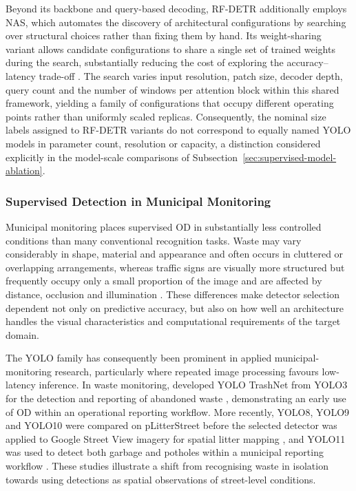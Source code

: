 Beyond its backbone and query-based decoding, \gls{RF-DETR} additionally employs \gls{NAS}, which automates the discovery of architectural configurations by searching over structural choices rather than fixing them by hand. Its weight-sharing variant allows candidate configurations to share a single set of trained weights during the search, substantially reducing the cost of exploring the accuracy--latency trade-off \cite{robinson2026rfdetrneuralarchitecturesearch}. The search varies input resolution, patch size, decoder depth, query count and the number of windows per attention block within this shared framework, yielding a family of configurations that occupy different operating points rather than uniformly scaled replicas. Consequently, the nominal size labels assigned to \gls{RF-DETR} variants do not correspond to equally named \gls{YOLO} models in parameter count, resolution or capacity, a distinction considered explicitly in the model-scale comparisons of Subsection~\ref{sec:supervised-model-ablation}.

\subsubsection{Supervised Detection in Municipal Monitoring}
\label{sec:bg-od-municipal}
Municipal monitoring places supervised \gls{OD} in substantially less controlled conditions than many conventional recognition tasks. Waste may vary considerably in shape, material and appearance and often occurs in cluttered or overlapping arrangements, whereas traffic signs are visually more structured but frequently occupy only a small proportion of the image and are affected by distance, occlusion and illumination \cite{BG17-small-signs,BG20-sign-glare}. These differences make detector selection dependent not only on predictive accuracy, but also on how well an architecture handles the visual characteristics and computational requirements of the target domain.

The \gls{YOLO} family has consequently been prominent in applied municipal-monitoring research, particularly where repeated image processing favours low-latency inference. In waste monitoring, \citeauthor{decarolis2020yolotrashnet} developed YOLO TrashNet from \gls{YOLO}3 for the detection and reporting of abandoned waste \cite{decarolis2020yolotrashnet}, demonstrating an early use of \gls{OD} within an operational reporting workflow. More recently, \gls{YOLO}8, \gls{YOLO}9 and \gls{YOLO}10 were compared on pLitterStreet before the selected detector was applied to Google Street View imagery for spatial litter mapping \cite{espinosa2025litter}, and \gls{YOLO}11 was used to detect both garbage and potholes within a municipal reporting workflow \cite{reddy2025yologarbagepothole}. These studies illustrate a shift from recognising waste in isolation towards using detections as spatial observations of street-level conditions.

